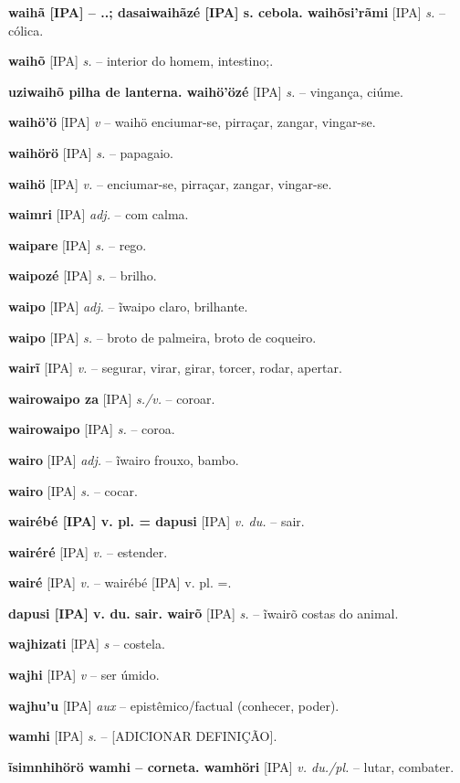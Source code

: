 \textbf{waihã [IPA]  -- ..; dasaiwaihãzé [IPA] s. cebola. waihõsi'rãmi} [IPA] \textit{s.} -- cólica.

\textbf{waihõ} [IPA] \textit{s.} -- interior do homem, intestino;.

\textbf{uziwaihõ pilha de lanterna. waihö'özé} [IPA] \textit{s.} -- vingança, ciúme.

\textbf{waihö'ö} [IPA] \textit{v} -- waihö enciumar-se, pirraçar, zangar, vingar-se.

\textbf{waihörö} [IPA] \textit{s.} -- papagaio.

\textbf{waihö} [IPA] \textit{v.} -- enciumar-se, pirraçar, zangar, vingar-se.

\textbf{waimri} [IPA] \textit{adj.} -- com calma.

\textbf{waipare} [IPA] \textit{s.} -- rego.

\textbf{waipozé} [IPA] \textit{s.} -- brilho.

\textbf{waipo} [IPA] \textit{adj.} -- ĩwaipo claro, brilhante.

\textbf{waipo} [IPA] \textit{s.} -- broto de palmeira, broto de coqueiro.

\textbf{wairĩ} [IPA] \textit{v.} -- segurar, virar, girar, torcer, rodar, apertar.

\textbf{wairowaipo za} [IPA] \textit{s./v.} -- coroar.

\textbf{wairowaipo} [IPA] \textit{s.} -- coroa.

\textbf{wairo} [IPA] \textit{adj.} -- ĩwairo frouxo, bambo.

\textbf{wairo} [IPA] \textit{s.} -- cocar.

\textbf{wairébé [IPA] v. pl. = dapusi} [IPA] \textit{v. du.} -- sair.

\textbf{wairéré} [IPA] \textit{v.} -- estender.

\textbf{wairé} [IPA] \textit{v.} -- wairébé [IPA] v. pl. =.

\textbf{dapusi [IPA] v. du. sair. wairõ} [IPA] \textit{s.} -- ĩwairõ costas do animal.

\textbf{wajhizati} [IPA] \textit{s} -- {costela}.

\textbf{wajhi} [IPA] \textit{v} -- {ser úmido}.

\textbf{wajhu'u} [IPA] \textit{aux} -- {epistêmico/factual (conhecer, poder)}.

\textbf{wamhi} [IPA] \textit{s.} -- [ADICIONAR DEFINIÇÃO].

\textbf{ĩsimnhihörö wamhi -- corneta. wamhöri} [IPA] \textit{v. du./pl.} -- lutar, combater.

